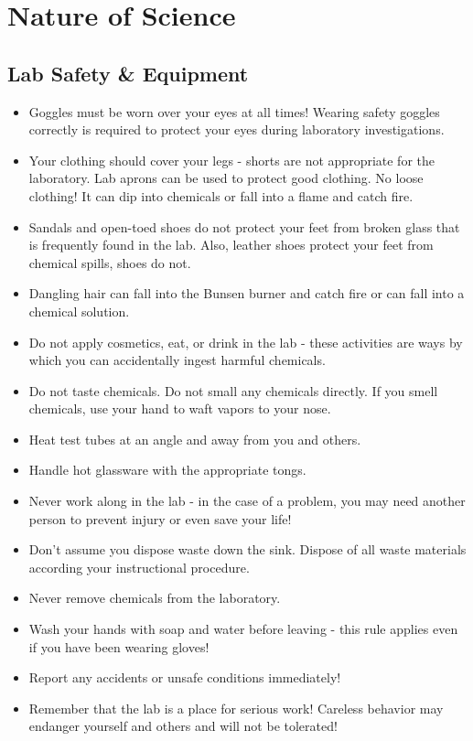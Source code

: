 \documentclass[../hchem.tex]{subfiles}
\begin{document}
\chapter{Nature of Science}
\section{Lab Safety \& Equipment}
\begin{itemize}
    \item Goggles must be worn over your eyes at all times! Wearing safety goggles correctly is required to protect your eyes during laboratory investigations.
    \item Your clothing should cover your legs - shorts are not appropriate for the laboratory. Lab aprons can be used to protect good clothing. No loose clothing! It can dip into chemicals or fall into a flame and catch fire.
    \item Sandals and open-toed shoes do not protect your feet from broken glass that is frequently found in the lab. Also, leather shoes protect your feet from chemical spills, shoes do not.
    \item Dangling hair can fall into the Bunsen burner and catch fire or can fall into a chemical solution.
    \item Do not apply cosmetics, eat, or drink in the lab - these activities are ways by which you can accidentally ingest harmful chemicals.
    \item Do not taste chemicals. Do not small any chemicals directly. If you smell chemicals, use your hand to waft vapors to your nose.
    \item Heat test tubes at an angle and away from you and others.
    \item Handle hot glassware with the appropriate tongs.
    \item Never work along in the lab - in the case of a problem, you may need another person to prevent injury or even save your life!
    \item Don't assume you dispose waste down the sink. Dispose of all waste materials according your instructional procedure.
    \item Never remove chemicals from the laboratory.
    \item Wash your hands with soap and water before leaving - this rule applies even if you have been wearing gloves!
    \item Report any accidents or unsafe conditions immediately!
    \item Remember that the lab is a place for serious work! Careless behavior may endanger yourself and others and will not be tolerated!
\end{itemize}
\end{document}
